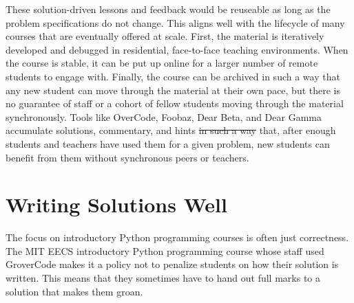 \documentclass[12pt,twoside]{mitthesis}
\providecommand{\DIFaddtex}[1]{{\protect\color{blue}\uwave{#1}}} %
\providecommand{\DIFdeltex}[1]{{\protect\color{red}\sout{#1}}}                      %
\providecommand{\DIFaddbegin}{} %
\providecommand{\DIFaddend}{} %
\providecommand{\DIFdelbegin}{} %
\providecommand{\DIFdelend}{} %
\providecommand{\DIFadd}[1]{\texorpdfstring{\DIFaddtex{#1}}{#1}} %
\providecommand{\DIFdel}[1]{\texorpdfstring{\DIFdeltex{#1}}{}} %
\begin{document}
These solution-driven lessons and feedback would be reuseable as long as the problem specifications do not change. This aligns well with the lifecycle of many courses that are eventually offered at scale. First, the material is iteratively developed and debugged in residential, face-to-face teaching environments. When the course is stable, it can be put up online for a larger number of remote students to engage with. Finally, the course can be archived in such a way that any new student can move through the material at their own pace, but there is no guarantee of staff or a cohort of fellow students moving through the material synchronously. Tools like OverCode, Foobaz, Dear Beta, and Dear Gamma accumulate solutions, commentary, and hints \DIFdelbegin \DIFdel{in such a way }\DIFdelend \DIFaddbegin \DIFadd{so }\DIFaddend that, after enough students and teachers have used them for a given problem, new students can benefit from them without synchronous peers or teachers.





\section{Writing Solutions Well}

The focus on introductory Python programming courses is often just correctness. The MIT EECS introductory Python programming course whose staff used GroverCode makes it a policy not to penalize students on how their solution is written. This means that they sometimes have to hand out full marks to a solution that makes them groan.
\end{document}
